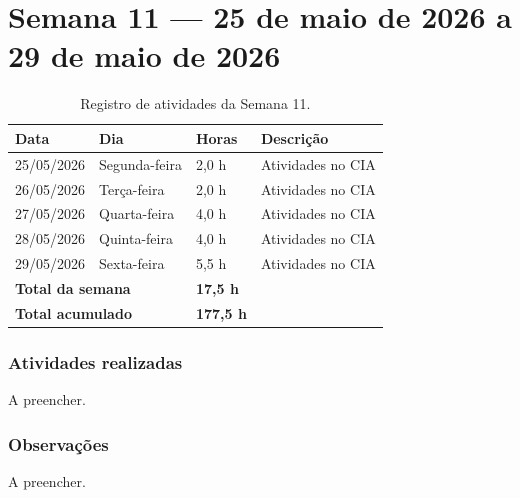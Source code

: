 
\section{Semana 11 --- 25 de maio de 2026 a 29 de maio de 2026}

\begin{table}[H]
\centering
\caption{Registro de atividades da Semana 11.}
\begin{tabular}{llll}
\toprule
\textbf{Data} & \textbf{Dia} & \textbf{Horas} & \textbf{Descrição} \\
\midrule
25/05/2026 & Segunda-feira & 2,0 h & Atividades no CIA \\
26/05/2026 & Terça-feira & 2,0 h & Atividades no CIA \\
27/05/2026 & Quarta-feira & 4,0 h & Atividades no CIA \\
28/05/2026 & Quinta-feira & 4,0 h & Atividades no CIA \\
29/05/2026 & Sexta-feira & 5,5 h & Atividades no CIA \\
\midrule
\multicolumn{2}{l}{\textbf{Total da semana}} & \textbf{17,5 h} & \\
\multicolumn{2}{l}{\textbf{Total acumulado}} & \textbf{177,5 h} & \\
\bottomrule
\end{tabular}
\end{table}

\subsubsection*{Atividades realizadas}

A preencher.

\subsubsection*{Observações}

A preencher.
